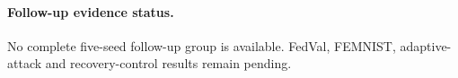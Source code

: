 \paragraph{Follow-up evidence status.}
No complete five-seed follow-up group is available. FedVal, FEMNIST, adaptive-attack and recovery-control results remain pending.
